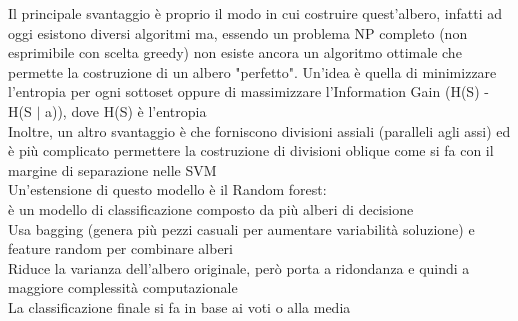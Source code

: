 \documentclass[10pt,oneside,a4paper]{article}
\begin{document}
	Il principale svantaggio è proprio il modo in cui costruire quest'albero, infatti ad oggi esistono diversi algoritmi ma, essendo un problema NP completo (non esprimibile con scelta greedy) non esiste ancora un algoritmo ottimale che permette la costruzione di un albero "perfetto". Un'idea è quella di minimizzare l'entropia per ogni sottoset oppure di massimizzare l'Information Gain (H(S) - H(S $ | $ a)), dove H(S) è l'entropia\\
	Inoltre, un altro svantaggio è che forniscono divisioni assiali (paralleli agli assi) ed è più complicato permettere la costruzione di divisioni oblique come si fa con il margine di separazione nelle SVM\\
	Un'estensione di questo modello è il Random forest:\\
	è un modello di classificazione composto da più alberi di decisione\\
	Usa bagging (genera più pezzi casuali per aumentare variabilità soluzione) e feature random per combinare alberi\\
	Riduce la varianza dell'albero originale, però porta a ridondanza e quindi a maggiore complessità computazionale\\
	La classificazione finale si fa in base ai voti o alla media

	
	
\end{document}
